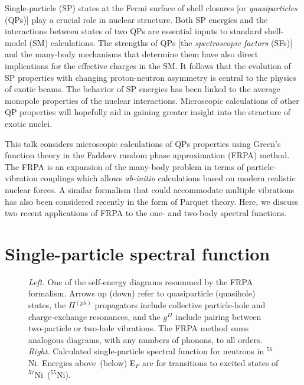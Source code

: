 \documentclass{ws-mpla}
\begin{document}
Single-particle (SP) states at the Fermi surface of shell closures [or
{\em quasiparticles} (QPs)] play a crucial role in nuclear structure.
Both SP energies and the interactions between states of two QPs are
essential inputs to standard shell-model (SM) calculations.
The strengths of QPs [the {\em spectroscopic factors} (SFs)] and the
many-body mechanisms that determine them have also direct implications
for the effective charges in the SM.
%
It follows that the evolution of SP properties with changing
proton-neutron asymmetry is central to the physics of exotic beams.
The behavior of SP energies has been linked to the average monopole
properties of the nuclear interactions.\cite{Ots.05,Ots.10}
Microscopic calculations of other QP properties will hopefully aid
in gaining greater insight into the structure of exotic nuclei.



This talk considers microscopic calculations of QPs properties
using Green's function theory in the Faddeev random phase approximation
(FRPA) method.\cite{bar.07,bar.09c}
 The FRPA is an expansion of the many-body problem in terms of
particle-vibration couplings which allows {\em ab-initio} calculations
based on modern realistic nuclear forces.
A similar formalism that could accommodate multiple vibrations has also
been considered recently in the form of Parquet theory.\cite{Ber.10}
%
Here, we discuss two recent applications of FRPA to the
one- and two-body spectral functions.


\section*{Single-particle spectral function}


\begin{figure}[t]
\centerline{ \hspace*{20pt}
            }
\caption{\label{fig_frpa}
{\em Left.} One of the self-energy diagrams resummed by the FRPA formalism.
 Arrows up (down) refer to quasiparticle (quasihole) states, the $\Pi^{(ph)}$
propagators include collective \hbox{particle-hole} and charge-exchange resonances, and the $g^{II}$
include pairing between two-particle or two-hole vibrations.
 The FRPA method sums analogous diagrams,
with any numbers of phonons, to all orders.\cite{bar.07,bar.09c}
{\em Right.}  Calculated single-particle spectral function for neutrons in $^{56}$Ni.
 Energies above~(below) E$_F$ are for transitions to excited
states of $^{57}$Ni~($^{55}$Ni). }
\end{figure}
\end{document}
